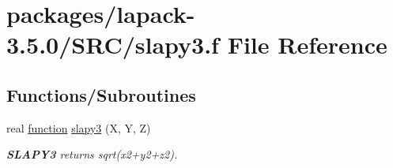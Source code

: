 \hypertarget{slapy3_8f}{}\section{packages/lapack-\/3.5.0/\+S\+R\+C/slapy3.f File Reference}
\label{slapy3_8f}
\subsection*{Functions/\+Subroutines}
\begin{DoxyCompactItemize}
\item 
real \hyperlink{afunc_8m_a7b5e596df91eadea6c537c0825e894a7}{function} \hyperlink{group__auxOTHERauxiliary_gadab147cb12ea8d677598a5aad10f7e4c}{slapy3} (X, Y, Z)
\begin{DoxyCompactList}\small\item\em {\bfseries S\+L\+A\+P\+Y3} returns sqrt(x2+y2+z2). \end{DoxyCompactList}\end{DoxyCompactItemize}

